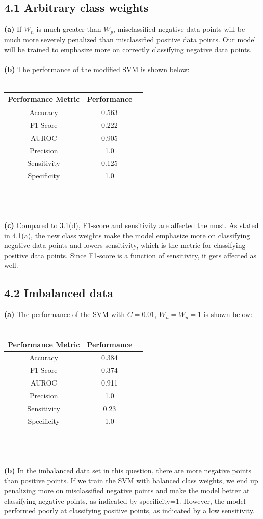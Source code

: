 \documentclass{article}
\begin{document}
\subsection*{4.1 Arbitrary class weights}
\textbf{(a)} If $W_n$ is much greater than $W_p$, misclassified negative data points will be much more severely penalized
than misclassified positive data points. Our model will be trained to emphasize more on correctly classifying negative data points.\\\\
\textbf{(b)} The performance of the modified SVM is shown below:\\\\
\begin{tabular}{|c|c|c|}
\hline
\bf Performance Metric & \bf Performance \\ \hline
Accuracy &  0.563 \\ \hline
F1-Score &  0.222 \\ \hline
AUROC &  0.905 \\ \hline
Precision &  1.0 \\ \hline
Sensitivity &  0.125 \\ \hline
Specificity &  1.0 \\ \hline
\end{tabular}\\ \\\\
\textbf{(c)} Compared to 3.1(d), F1-score and sensitivity are affected the most.
As stated in 4.1(a), the new class weights make the model emphasize more on classifying negative data points and lowers
sensitivity, which is the metric for classifying positive data points. Since F1-score is a function of sensitivity,
it gets affected as well.
\subsection*{4.2 Imbalanced data}
\textbf{(a)} The performance of the SVM with $C=0.01$, $W_n=W_p=1$ is shown below:\\\\
\begin{tabular}{|c|c|c|}
\hline
\bf Performance Metric & \bf Performance \\ \hline
Accuracy &  0.384 \\ \hline
F1-Score &  0.374 \\ \hline
AUROC &  0.911 \\ \hline
Precision &  1.0 \\ \hline
Sensitivity &  0.23 \\ \hline
Specificity &  1.0 \\ \hline
\end{tabular}\\ \\\\
\textbf{(b)} In the imbalanced data set in this question, there are more negative points than positive points.
If we train the SVM with balanced class weights, we end up penalizing more on misclassified negative points and
make the model better at classifying negative points, as indicated by specificity=1.
However, the model performed poorly at classifying positive points, as indicated by a low sensitivity.
\end{document}
